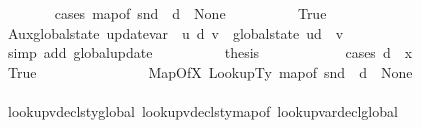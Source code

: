 \begin{isabellebody}
\ \ \ \ \ \ \isamarkupfalse%
\ {\isacharparenleft}{\kern0pt}cases\ {\isachardoublequoteopen}map{\isacharunderscore}{\kern0pt}of\ {\isacharparenleft}{\kern0pt}snd\ {\isasymLambda}{\isacharprime}{\kern0pt}{\isacharparenright}{\kern0pt}\ d\ {\isacharequal}{\kern0pt}\ None{\isachardoublequoteclose}{\isacharparenright}{\kern0pt}\isanewline
\ \ \ \ \ \ \ \ \isamarkupfalse%
\ True\ \isanewline
\ \ \ \ \ \ \ \ \isamarkupfalse%
\ Aux{}{\isacharcolon}{\kern0pt}{\isachardoublequoteopen}global{\isacharunderscore}{\kern0pt}state\ {\isacharparenleft}{\kern0pt}update{\isacharunderscore}{\kern0pt}var\ {\isasymLambda}{\isacharprime}{\kern0pt}\ u\ d\ v{\isacharparenright}{\kern0pt}\ {\isacharequal}{\kern0pt}\ {\isacharparenleft}{\kern0pt}global{\isacharunderscore}{\kern0pt}state\ u{\isacharparenright}{\kern0pt}{\isacharparenleft}{\kern0pt}d\ {\isasymmapsto}\ v{\isacharparenright}{\kern0pt}{\isachardoublequoteclose}\ \ \isamarkupfalse%
\ {\isacharparenleft}{\kern0pt}simp\ add{\isacharcolon}{\kern0pt}\ global{\isacharunderscore}{\kern0pt}update{\isacharparenright}{\kern0pt}\isanewline
\ \ \ \ \ \ \ \ \isamarkupfalse%
\ {\isacharquery}{\kern0pt}thesis\isanewline
\ \ \ \ \ \ \ \ \ \ \isamarkupfalse%
\ {\isacharparenleft}{\kern0pt}cases\ {\isachardoublequoteopen}d\ {\isacharequal}{\kern0pt}\ x{\isachardoublequoteclose}{\isacharparenright}{\kern0pt}\isanewline
\ \ \ \ \ \ \ \ \ \ \ \ \isamarkupfalse%
\ True\isanewline
\ \ \ \ \ \ \ \ \ \ \ \ \isamarkupfalse%
\ \isamarkupfalse%
\ MapOfX\ LookupTy\ {\isacartoucheopen}map{\isacharunderscore}{\kern0pt}of\ {\isacharparenleft}{\kern0pt}snd\ {\isasymLambda}{\isacharprime}{\kern0pt}{\isacharparenright}{\kern0pt}\ d\ {\isacharequal}{\kern0pt}\ None{\isacartoucheclose}\ \isamarkupfalse%
\ {\isachardoublequoteopen}{\isasymtau}\ {\isacharequal}{\kern0pt}\ {\isasymtau}{\isacharprime}{\kern0pt}{\isachardoublequoteclose}\isanewline
\ \ \ \ \ \ \ \ \ \ \ \ \ \ \isamarkupfalse%
\ lookup{\isacharunderscore}{\kern0pt}vdecls{\isacharunderscore}{\kern0pt}ty{\isacharunderscore}{\kern0pt}global{\isacharunderscore}{\kern0pt}{}\ lookup{\isacharunderscore}{\kern0pt}vdecls{\isacharunderscore}{\kern0pt}ty{\isacharunderscore}{\kern0pt}map{\isacharunderscore}{\kern0pt}of\ lookup{\isacharunderscore}{\kern0pt}var{\isacharunderscore}{\kern0pt}decl{\isacharunderscore}{\kern0pt}global\ \ \ \ \ \ \ \ \ \ \ \ \ \ \isanewline

\end{isabellebody}
